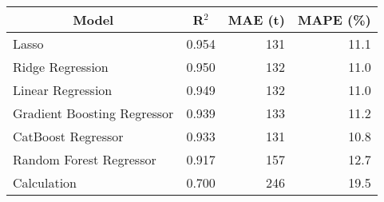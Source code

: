 
\begin{tabular}[t]{lrrr}
\toprule
\multicolumn{1}{c}{Model} & \multicolumn{1}{c}{R$^2$} & \multicolumn{1}{c}{MAE (t)} & \multicolumn{1}{c}{MAPE (\%)}\\
\midrule
Lasso & 0.954 & 131 & 11.1\\
Ridge Regression & 0.950 & 132 & 11.0\\
Linear Regression & 0.949 & 132 & 11.0\\
Gradient Boosting Regressor & 0.939 & 133 & 11.2\\
CatBoost Regressor & 0.933 & 131 & 10.8\\
Random Forest Regressor & 0.917 & 157 & 12.7\\
Calculation & 0.700 & 246 & 19.5\\
\bottomrule
\end{tabular}
